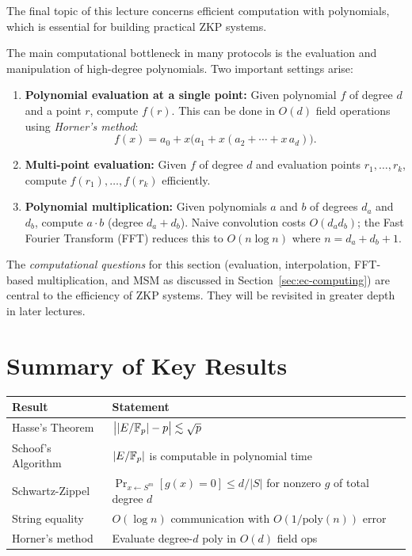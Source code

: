 \documentclass[11pt]{article}
\begin{document}
The final topic of this lecture concerns efficient computation with
polynomials, which is essential for building practical ZKP systems.

The main computational bottleneck in many protocols is the evaluation
and manipulation of high-degree polynomials. Two important settings arise:

\begin{enumerate}
  \item \textbf{Polynomial evaluation at a single point:} Given polynomial
        $f$ of degree $d$ and a point $r$, compute $f(r)$.
        This can be done in $O(d)$ field operations using
        \emph{Horner's method}:
        \[
          f(x) = a_0 + x\bigl(a_1 + x(a_2 + \cdots + x\,a_d)\bigr).
        \]

  \item \textbf{Multi-point evaluation:} Given $f$ of degree $d$ and
        evaluation points $r_1, \ldots, r_k$, compute
        $f(r_1), \ldots, f(r_k)$ efficiently.

  \item \textbf{Polynomial multiplication:} Given polynomials $a$ and $b$
        of degrees $d_a$ and $d_b$, compute $a \cdot b$ (degree
        $d_a + d_b$). Naive convolution costs $O(d_a d_b)$; the
        Fast Fourier Transform (FFT) reduces this to
        $O(n \log n)$ where $n = d_a + d_b + 1$.
\end{enumerate}

\begin{remark}
  The \emph{computational questions} for this section (evaluation,
  interpolation, FFT-based multiplication, and MSM as discussed in
  Section~\ref{sec:ec-computing}) are central to the efficiency of
  ZKP systems. They will be revisited in greater depth in later lectures.
\end{remark}

\appendix
\section*{Summary of Key Results}

\begin{center}
\renewcommand{\arraystretch}{1.4}
\begin{tabular}{|l|l|}
\hline
\textbf{Result} & \textbf{Statement} \\
\hline
Hasse's Theorem & $\bigl||E/\mathbb{F}_p| - p\bigr| \lesssim \sqrt{p}$ \\
\hline
Schoof's Algorithm & $|E/\mathbb{F}_p|$ is computable in polynomial time \\
\hline
Schwartz-Zippel & $\Pr_{x\leftarrow S^m}[g(x)=0] \leq d/|S|$ for nonzero $g$ of total degree $d$ \\
\hline
String equality & $O(\log n)$ communication with $O(1/\mathrm{poly}(n))$ error \\
\hline
Horner's method & Evaluate degree-$d$ poly in $O(d)$ field ops \\
\hline
\end{tabular}
\end{center}
\end{document}
